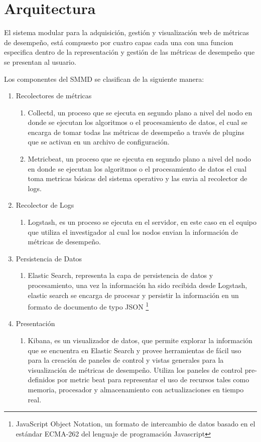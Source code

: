 \chapter{Arquitectura}

El sistema modular para la adquisición, gestión y visualización web de métricas de desempeño, está compuesto por cuatro capas cada una con una funcion especifica dentro de la representación y gestión de las métricas de desempeño que se presentan al usuario.

Los componentes del SMMD se clasifican de la siguiente manera:
\begin{enumerate}
	\item Recolectores de métricas
    \begin{enumerate}
    \item Collectd, un proceso que se ejecuta en segundo plano a nivel del nodo en donde se ejecutan los algoritmos o el procesamiento de datos, el cual se encarga de tomar todas las métricas de desempeño a través de plugins que se activan en un archivo de configuración.
    \item Metricbeat, un proceso que se ejecuta en segundo plano a nivel del nodo en donde se ejecutan los algoritmos o el procesamiento de datos el cual toma metricas básicas del sistema operativo y las envia al recolector de logs.
    \end{enumerate}
    \item Recolector de Logs
	\begin{enumerate}
      \item Logstash, es un proceso se ejecuta en el servidor, en este caso en el equipo que utiliza el investigador al cual los nodos envian la información de métricas de desempeño.
    \end{enumerate}
    \item Persistencia de Datos
    \begin{enumerate}
      \item Elastic Search, representa la capa de persistencia de datos y procesamiento, una vez la información ha sido recibida desde Logstash, elastic search se encarga de procesar y persistir la información en un formato de documento de typo JSON \footnote[1]{JavaScript Object Notation, un formato de intercambio de datos basado en el estándar ECMA-262 del lenguaje de programación Javascript}
    \end{enumerate}
    \item Presentación
    \begin{enumerate}
      \item Kibana, es un visualizador de datos, que permite explorar la información que se encuentra en Elastic Search y provee herramientas de fácil uso para la creación de paneles de control y vistas generales para la visualización de métricas de desempeño. Utiliza los paneles de control pre-definidos por metric beat para representar el uso de recursos tales como memoria, procesador y almacenamiento con actualizaciones en tiempo real.
    \end{enumerate}
\end{enumerate}

